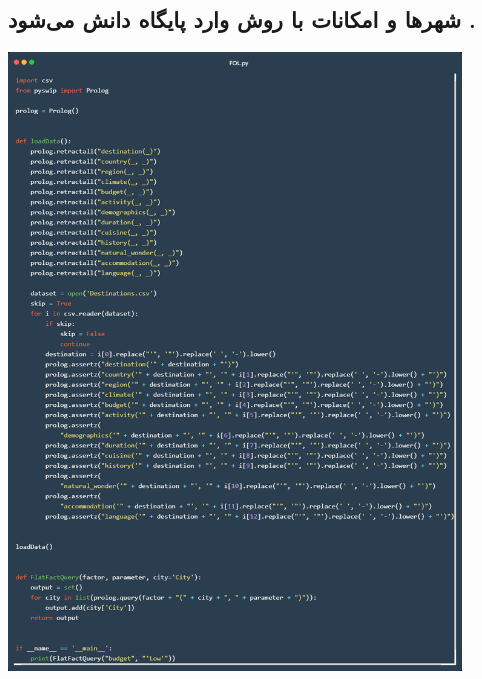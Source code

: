 \documentclass[12pt, dvipsnames, svgnames, x11names,]{article}
\begin{document}
		\subsection{شهرها و امکانات با روش  وارد پایگاه دانش می‌شود .}
			\begin{center}
				\includegraphics[width=12cm]{images/02}
			\end{center}
			
\end{document}
